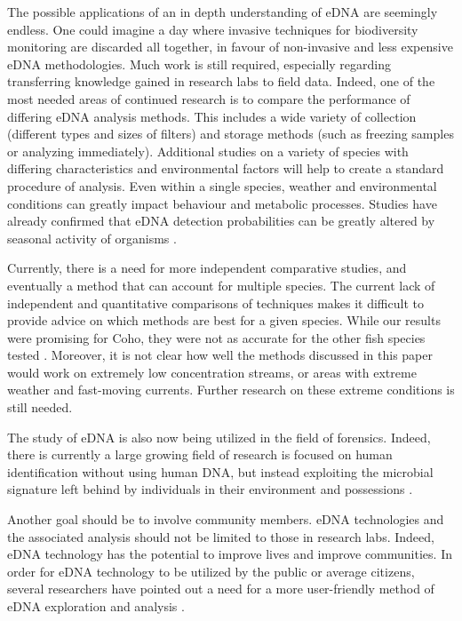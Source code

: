The possible applications of an in depth understanding of eDNA are seemingly endless. One could imagine a day where invasive techniques for biodiversity monitoring are discarded all together, in favour of non-invasive and less expensive eDNA methodologies. Much work is still required, especially regarding transferring knowledge gained in research labs to field data. Indeed, one of the most needed areas of continued research is to compare the performance of  differing eDNA analysis methods. This includes a wide variety of collection (different types and sizes of filters) and storage methods (such as freezing samples or analyzing immediately). Additional studies on a variety of species with differing characteristics and environmental factors will help to create a standard procedure of analysis. Even within a single species, weather and environmental conditions can greatly impact behaviour and metabolic processes. Studies have already confirmed that eDNA detection  probabilities can be greatly altered by seasonal activity of organisms \citep{seasonal}.
\vspace{5mm}




Currently, there is a need for more independent comparative studies, and eventually a method that can account for multiple species.
The current lack of independent and quantitative comparisons of techniques makes it difficult to provide advice on which methods are best for a given species.
While our results were promising for Coho, they were not as accurate for the other fish species tested \citep{noninvasive}. Moreover, it is not clear how well the methods discussed in this paper would work on extremely low concentration streams, or areas with extreme weather and fast-moving currents. Further research on these extreme conditions is still needed.


\vspace{5mm}

The study of eDNA is also now being utilized in the field of forensics. Indeed,  there is currently a large growing field of research is focused on  human identification
without using human DNA, but instead exploiting the microbial signature left behind by individuals in their environment and possessions \citep{futureforensics}.



\vspace{5mm}

Another goal should be to involve community members. eDNA technologies and the associated analysis should not be limited to those in research labs. Indeed, eDNA technology has the potential to improve lives and improve communities. In order for eDNA technology to be utilized by the public or average citizens, several researchers have pointed out a need for a more user-friendly method of eDNA exploration and analysis \citep{globaleDNA}.
\vspace{5mm}

